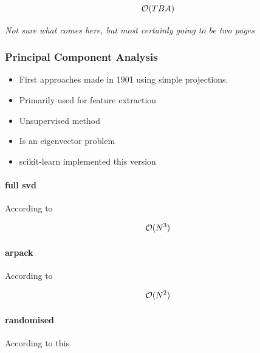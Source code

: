 $$\mathcal{O}(TBA)$$

\clearpage


\begin{center}
	\textit{Not sure what comes here, but most certainly going to be two pages}
\end{center}

\clearpage





\subsubsection{Principal Component Analysis}

\begin{itemize}
	\item First approaches made in 1901 using simple projections. \cite{pearson1901liii}
	\item Primarily used for feature extraction \cite{PythonMachineLearningCh5}
	\item Unsupervised method \cite{PythonMachineLearningCh5}
	\item Is an eigenvector problem \cite{MultilinearSubspaceLearningCh2}
	\item scikit-learn implemented this version \cite{minka2000automatic}
\end{itemize}

\clearpage

\paragraph{full \gls{svd}}

According to \cite{wright2001large}

$$\mathcal{O}(N^3)$$

\clearpage

\paragraph{\gls{arpack}}

According to \cite{wright2001large}

$$\mathcal{O}(N^2)$$

\clearpage

\paragraph{randomised}

According to this \cite{HandsOnMLCh8}

